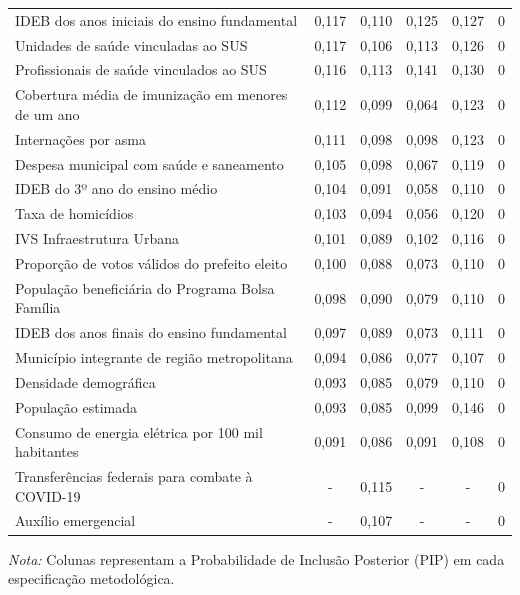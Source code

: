 \begin{table}[htbp]
\begin{tabular}{lccccr}
IDEB dos anos iniciais do ensino fundamental & 0,117 & 0,110 & 0,125 & 0,127 & 0 \\
Unidades de saúde vinculadas ao SUS & 0,117 & 0,106 & 0,113 & 0,126 & 0 \\
Profissionais de saúde vinculados ao SUS & 0,116 & 0,113 & 0,141 & 0,130 & 0 \\
Cobertura média de imunização em menores de um ano & 0,112 & 0,099 & 0,064 & 0,123 & 0 \\
Internações por asma & 0,111 & 0,098 & 0,098 & 0,123 & 0 \\
Despesa municipal com saúde e saneamento & 0,105 & 0,098 & 0,067 & 0,119 & 0 \\
IDEB do 3º ano do ensino médio & 0,104 & 0,091 & 0,058 & 0,110 & 0 \\
Taxa de homicídios & 0,103 & 0,094 & 0,056 & 0,120 & 0 \\
IVS Infraestrutura Urbana & 0,101 & 0,089 & 0,102 & 0,116 & 0 \\
Proporção de votos válidos do prefeito eleito & 0,100 & 0,088 & 0,073 & 0,110 & 0 \\
População beneficiária do Programa Bolsa Família & 0,098 & 0,090 & 0,079 & 0,110 & 0 \\
IDEB dos anos finais do ensino fundamental & 0,097 & 0,089 & 0,073 & 0,111 & 0 \\
Município integrante de região metropolitana & 0,094 & 0,086 & 0,077 & 0,107 & 0 \\
Densidade demográfica & 0,093 & 0,085 & 0,079 & 0,110 & 0 \\
População estimada & 0,093 & 0,085 & 0,099 & 0,146 & 0 \\
Consumo de energia elétrica por 100 mil habitantes & 0,091 & 0,086 & 0,091 & 0,108 & 0 \\
Transferências federais para combate à COVID-19 & - & 0,115 & - & - & 0 \\
Auxílio emergencial & - & 0,107 & - & - & 0 \\
\bottomrule
\end{tabular}
\begin{tablenotes}\footnotesize
\item \textit{Nota:} Colunas representam a Probabilidade de Inclusão Posterior (PIP) em cada especificação metodológica.
\end{tablenotes}
\end{table}